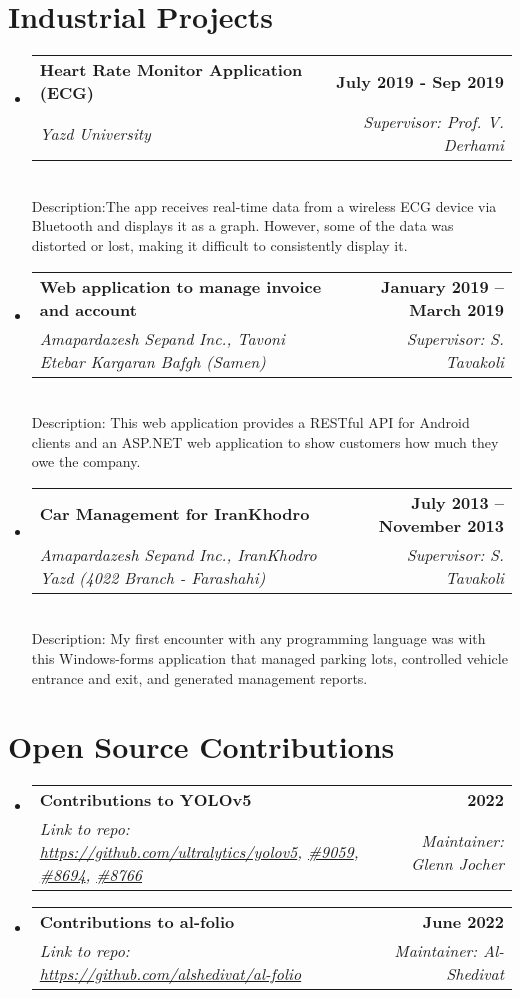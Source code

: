 \documentclass[letterpaper,11pt]{article}
\makeatletter
\newcommand{\resumeSubheading}[4]{
  \vspace{-2pt}\item
    \begin{tabular*}{1.0\textwidth}[t]{l@{\extracolsep{\fill}}r}
      \textbf{#1} & \textbf{\small #2} \\
    \textcolor{sgray} {\textit{\small#3}} & \textcolor{sgray}{ \textit{\small #4} }\\
    \end{tabular*}\vspace{-7pt}
}
\newcommand{\resumeSubheadingD}[5]{
  \vspace{-2pt}\item
    \begin{tabular*}{1.0\textwidth}[t]{l@{\extracolsep{\fill}}r}
      \textbf{#1} & \textbf{\small #2} \\
    \textcolor{sgray} {\textit{\small#3}} & \textcolor{sgray}{ \textit{\small #4} }\\
    \end{tabular*} %
    \\ \vspace{3pt}
    Description:{#5}
}
\newcommand{\resumeSubHeadingListStart}{\begin{itemize}[leftmargin=0.0in, label={}]}
\newcommand{\resumeSubHeadingListEnd}{\end{itemize}}
\makeatother
\begin{document}
 
 
\section{Industrial Projects}

\resumeSubHeadingListStart
\resumeSubheadingD
{Heart Rate Monitor Application (ECG)}{
	July 2019 - Sep 2019
 }
{Yazd University}
{Supervisor: Prof. V. Derhami}
{The app receives real-time data from a wireless ECG device via Bluetooth and displays it as a graph. However, some of the data was distorted or lost, making it difficult to consistently display it. }
\resumeSubHeadingListEnd


  \resumeSubHeadingListStart
    \resumeSubheadingD
      {Web application to manage invoice and account }{January 2019 – March 2019}
      {Amapardazesh Sepand Inc., Tavoni Etebar Kargaran Bafgh (Samen)}{Supervisor: S. Tavakoli}
      {
      	This web application provides a RESTful API for Android clients and an ASP.NET web application to show customers how much they owe the company.}
  \resumeSubHeadingListEnd
  
  
 
  
  \resumeSubHeadingListStart
  \resumeSubheadingD
  {Car Management for IranKhodro}{July 2013 – November 2013}
  {Amapardazesh Sepand Inc., IranKhodro Yazd (4022 Branch - Farashahi)}{Supervisor: S. Tavakoli}
  { My first encounter with any programming language was with this Windows-forms application that managed parking lots, controlled vehicle entrance and exit, and generated management reports. }
  \resumeSubHeadingListEnd
  
  
  
  
  \section{Open Source Contributions}
  
   \resumeSubHeadingListStart
  \resumeSubheading
  {Contributions to YOLOv5}{2022}
  {Link to repo: \url{https://github.com/ultralytics/yolov5},
\href{https://github.com/ultralytics/yolov5/issues/9059}{\#9059},
\href{https://github.com/ultralytics/yolov5/pull/8694}{\#8694},
\href{https://github.com/ultralytics/yolov5/pull/8766}{\#8766}  
 }{Maintainer: Glenn Jocher}{ 
}
  \resumeSubHeadingListEnd
   \resumeSubHeadingListStart
  \resumeSubheading
  {Contributions to al-folio}{June 2022}
  {Link to repo: \url{https://github.com/alshedivat/al-folio} }{Maintainer: Al-Shedivat}{
  	
}
  \resumeSubHeadingListEnd
  
\end{document}

